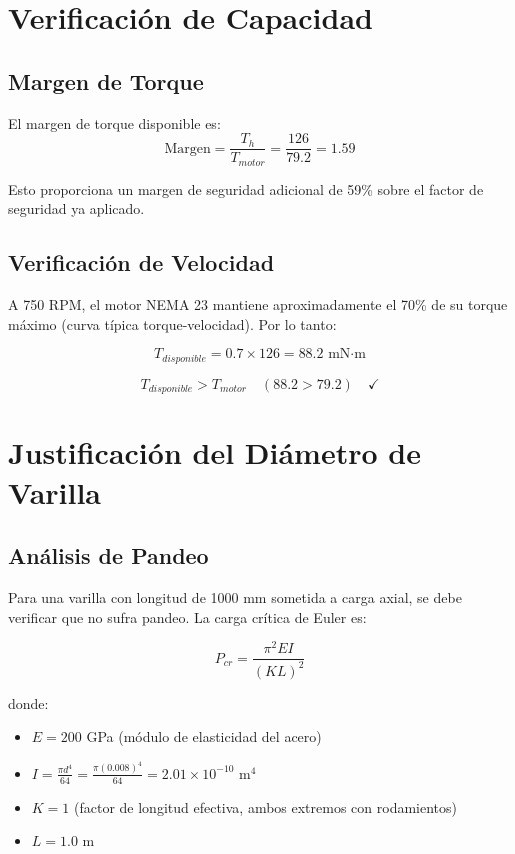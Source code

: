 \section{Verificación de Capacidad}

\subsection{Margen de Torque}
El margen de torque disponible es:
\begin{equation}
\text{Margen} = \frac{T_h}{T_{motor}} = \frac{126}{79.2} = 1.59
\end{equation}

Esto proporciona un margen de seguridad adicional de 59\% sobre el factor de seguridad ya aplicado.

\subsection{Verificación de Velocidad}
A 750 RPM, el motor NEMA 23 mantiene aproximadamente el 70\% de su torque máximo (curva típica torque-velocidad). Por lo tanto:

\begin{equation}
T_{disponible} = 0.7 \times 126 = 88.2 \text{ mN·m}
\end{equation}

\begin{equation}
T_{disponible} > T_{motor} \quad (88.2 > 79.2) \quad \checkmark
\end{equation}

\section{Justificación del Diámetro de Varilla}

\subsection{Análisis de Pandeo}
Para una varilla con longitud de 1000 mm sometida a carga axial, se debe verificar que no sufra pandeo. La carga crítica de Euler es:

\begin{equation}
P_{cr} = \frac{\pi^2 E I}{(K L)^2}
\end{equation}

donde:
\begin{itemize}
    \item $E = 200$ GPa (módulo de elasticidad del acero)
    \item $I = \frac{\pi d^4}{64} = \frac{\pi (0.008)^4}{64} = 2.01 \times 10^{-10}$ m$^4$
    \item $K = 1$ (factor de longitud efectiva, ambos extremos con rodamientos)
    \item $L = 1.0$ m
\end{itemize}

